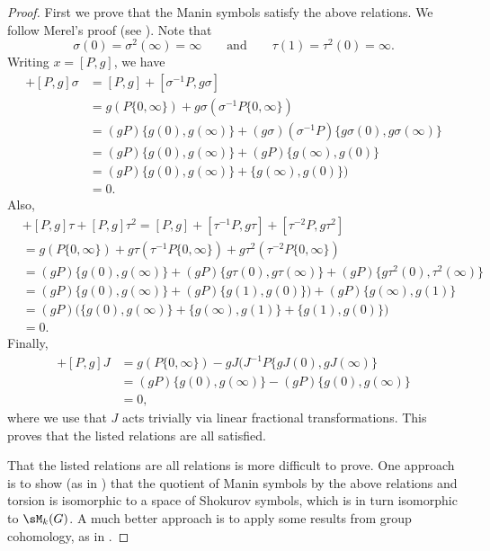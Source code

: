 \begin{proof}
First we prove that the Manin symbols
satisfy the above relations.
We follow Merel's proof (see \cite[\S1.2]{merel:1585}).
Note that 
$$\sigma(0) = \sigma^2(\infty) = \infty
\qquad\text{and}\qquad
  \tau(1) = \tau^2(0) = \infty.
$$
Writing $x=[P,g]$, we have 
\begin{align*}
[P,g] + [P,g]\sigma &= 
  [P,g]  + [\sigma^{-1}P, g\sigma]\\
 &= g(P\{0,\infty\}) + g\sigma (\sigma^{-1}P \{0,\infty\})\\
 &=
  (gP) \{ g(0), g(\infty) \} + 
  (g\sigma)(\sigma^{-1} P)\{ g\sigma(0), g\sigma(\infty)\} \\
  &=   (gP) \{ g(0), g(\infty) \} + 
  (gP)\{ g(\infty), g(0)\} \\ 
  &= (gP)\{ g(0), g(\infty) \} + \{ g(\infty), g(0)\})\\
  &= 0.
\end{align*}
Also, 
\begin{align*}
[P,g] &+ [P,g]\tau + [P,g]\tau^2 = 
  [P,g]  + [\tau^{-1}P, g\tau] + [\tau^{-2}P, g\tau^2]\\
  &= 
g(P\{0,\infty\}) + 
   g\tau(\tau^{-1}P \{0,\infty\}) 
   + g\tau^2(\tau^{-2}P \{0,\infty\}) \\
&= (gP) \{ g(0), g(\infty) \} + 
   (gP) \{ g \tau(0),g\tau(\infty)\}
   + (gP) \{ g\tau^2(0),\tau^2(\infty)\} \\
&= (gP) \{ g(0), g(\infty) \} + 
   (gP) \{ g(1),g(0)\}) 
   + (gP) \{ g(\infty), g(1)\} \\
 &= (gP)\bigl(\{ g(0), g(\infty)\} + 
\{ g(\infty), g(1)\} + \{ g(1),g(0)\}\bigr) \\
&= 0.
\end{align*}
Finally, 
\begin{align*}
[P,g] + [P,g]J &= 
  g(P\{0,\infty\}) - gJ(J^{-1} P \{gJ(0), gJ(\infty)\}\\
  &= (gP)\{g(0),g(\infty)\} - (gP) \{g(0),g(\infty)\}\\
  &= 0,
\end{align*}
where we use that $J$ acts trivially via linear fractional
transformations.  This proves that the
listed relations are all satisfied. 

That the listed relations are all relations is more difficult to
prove.  One
approach is to show (as in \cite[\S1.3]{merel:1585}) that the quotient
of Manin symbols by the above relations and torsion is isomorphic to a
space of Shokurov symbols, which is in turn isomorphic to
$\sM_k(G)$.  A much better approach is to apply some results
from group cohomology, as in 
\cite{gabor:phd}.
\end{proof}


